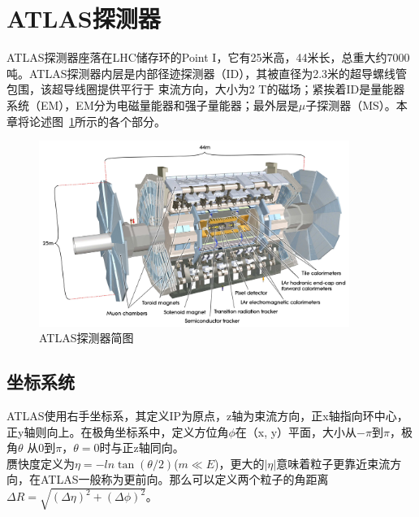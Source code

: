 \section{ATLAS探测器} \label{sec:ATLAS}
ATLAS探测器座落在LHC储存环的Point I，它有25米高，44米长，总重大约7000吨。ATLAS探测器内层是内部径迹探测器（ID），其被直径为2.3米的超导螺线管包围，该超导线圈提供平行于
束流方向，大小为2 T的磁场；紧挨着ID是量能器系统（EM），EM分为电磁量能器和强子量能器；最外层是$\mu$子探测器（MS）。本章将论述图~\ref{fig:ATLAS_schematic}所示的各个部分。

\begin{figure}[h]
\begin{center}
\includegraphics[width=0.9\textwidth]{fig/ATLAS_SE_Corrected7.pdf}
\caption{ATLAS探测器简图} \label{fig:ATLAS_schematic}
\end{center}
\end{figure}

\subsection{坐标系统}
ATLAS使用右手坐标系，其定义IP为原点，z轴为束流方向，正x轴指向环中心，正y轴则向上。在极角坐标系中，定义方位角$\phi$在（x, y）平面，大小从$-\pi$到$\pi$，极角$\theta$
从0到$\pi$，$\theta=0$时与正z轴同向。\\
赝快度定义为$\eta = -ln\tan(\theta/2)$($m\ll E$)，更大的$|\eta|$意味着粒子更靠近束流方向，在ATLAS一般称为更前向。那么可以定义两个粒子的角距离$\Delta R=\sqrt{(\Delta\eta)^2+(\Delta\phi)^2}$。

